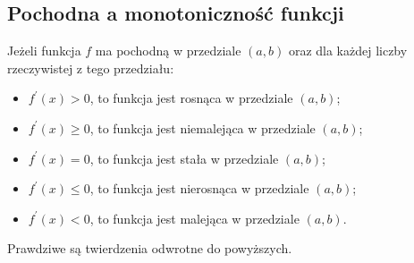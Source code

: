 \documentclass[14pt,a4paper]{extarticle}
\begin{document}
\subsection{Pochodna a monotoniczność funkcji}

Jeżeli funkcja $f$ ma pochodną w przedziale $(a, b)$ oraz dla każdej liczby rzeczywistej z tego przedziału:
\begin{itemize}
   \item $f^{\prime}(x) > 0$, to funkcja jest rosnąca w przedziale $(a, b)$;
   \item $f^{\prime}(x) \geq 0$, to funkcja jest niemalejąca w przedziale $(a, b)$;
   \item $f^{\prime}(x) = 0$, to funkcja jest stała w przedziale $(a, b)$;
   \item $f^{\prime}(x) \leq 0$, to funkcja jest nierosnąca w przedziale $(a, b)$;
   \item $f^{\prime}(x) < 0$, to funkcja jest malejąca w przedziale $(a, b)$.
\end{itemize}

Prawdziwe są twierdzenia odwrotne do powyższych.
\end{document}
